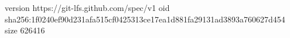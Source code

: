 version https://git-lfs.github.com/spec/v1
oid sha256:1f0240ef90d231afa515cf0425313ce17ea1d881fa29131ad3893a760627d454
size 626416
